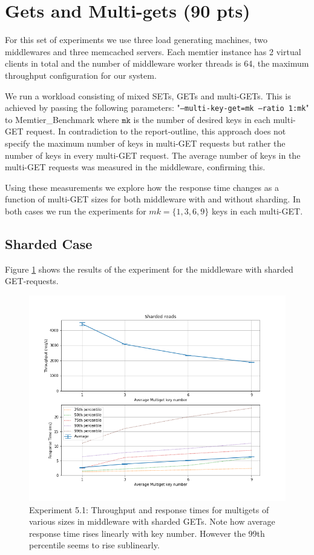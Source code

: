\documentclass[11pt,a4paper]{article}
\begin{document}
\newpage

\section{Gets and Multi-gets (90 pts)}

For this set of experiments we use three load generating machines, two middlewares and three memcached servers. Each memtier instance has 2 virtual clients in total and the number of middleware worker threads is 64, the maximum throughput configuration for our system.

We run a workload consisting of mixed SETs, GETs and multi-GETs. This is achieved by passing the following parameters: "\texttt{--multi-key-get=mk --ratio 1:mk}" to Memtier\_Benchmark where $\texttt{mk}$ is the number of desired keys in each multi-GET request. In contradiction to the report-outline, this approach does not specify the maximum number of keys in multi-GET requests but rather the number of keys in every multi-GET request. The average number of keys in the multi-GET requests was measured in the middleware, confirming this.

Using these measurements we explore how the response time changes as a function of multi-GET sizes for both middleware with and without sharding. In both cases we run the experiments for $mk = \{ 1, 3, 6, 9 \}$ keys in each multi-GET.

\subsection{Sharded Case}

Figure \ref{fig:51_all_req} shows the results of the experiment for the middleware with sharded GET-requests.

\begin{figure}
\centering
\includegraphics[width=.9\textwidth]{51/51_all_requests.png}
\caption{Experiment 5.1: Throughput and response times for multigets of various sizes in middleware with sharded GETs. Note how average response time rises linearly with key number. However the 99th percentile seems to rise sublinearly.}
\label{fig:51_all_req}
\end{figure}
\end{document}
